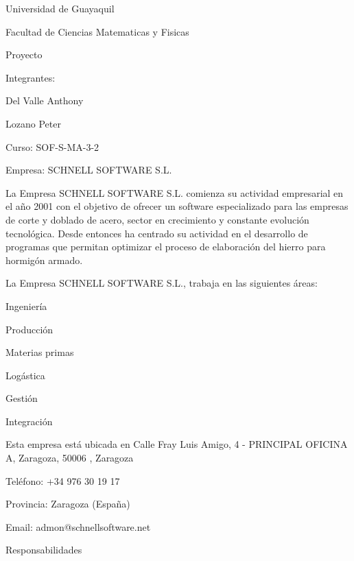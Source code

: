 \documentclass[10pt,a4paper]{article}
\begin{document}
Universidad de Guayaquil

Facultad de Ciencias Matematicas y Fisicas

Proyecto

Integrantes:

Del Valle Anthony

Lozano Peter

Curso: SOF-S-MA-3-2


Empresa: SCHNELL SOFTWARE S.L.

La Empresa SCHNELL SOFTWARE S.L. comienza su actividad empresarial en el año 2001 con el objetivo de ofrecer un software especializado para las empresas de corte y doblado de acero, sector en crecimiento y constante evolución tecnológica. Desde entonces ha centrado su actividad en el desarrollo de programas que permitan optimizar el proceso de elaboración del hierro para hormigón armado.

La Empresa SCHNELL SOFTWARE S.L., trabaja en las siguientes áreas:

Ingeniería

Producción

Materias primas

Logástica

Gestión

Integración

Esta empresa está ubicada en Calle Fray Luis Amigo, 4 - PRINCIPAL OFICINA A, Zaragoza, 50006 , Zaragoza

Teléfono: +34 976 30 19 17

Provincia: Zaragoza (España)

Email: admon@schnellsoftware.net

Responsabilidades
\end{document}
